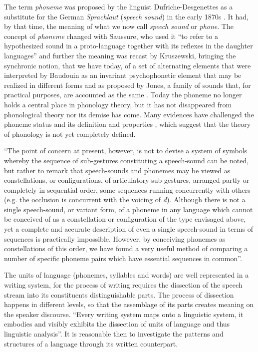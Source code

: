 The term \textit{phoneme} was proposed by the linguist Dufriche-Desgenettes
as a substitute for the German \textit{Sprachlaut} (\textit{speech sound}) in the early 1870s \citep{dresher2011}.
It had, by that time, the meaning of what we now call \textit{speech sound} or \textit{phone}.
The concept of \textit{phoneme} changed with Saussure, who used it ``to refer to a hypothesized sound in a 
proto-language together with its reflexes in the daughter languages'' and further the meaning was 
recast by Kruszewski, bringing the synchronic notion, that we have today, of a set of alternating elements 
that were interpreted by Baudouin as an invariant psychophonetic element that may be realized in different forms
and as proposed by Jones, a family of sounds that, for practical purposes, are
accounted as the same \citep{dresher2011}. Today the phoneme no longer holds a central place
in phonology theory, but it has not disappeared from phonological theory nor its demise has come.
Many evidences have challenged the phoneme status and
its definition and properties \citep{port2007,port2005,port2006}, which suggest that the 
theory of phonology is not yet completely defined.


``The point of concern at present, however, is not to
devise a system of symbols whereby the sequence of sub-gestures constituting a speech-sound 
can be noted, but rather to remark that speech-sounds and phonemes may be
viewed as constellations, or configurations, of articulatory sub-gestures, arranged partly
or completely in sequential order, some sequences running concurrently with others (e.g.
the occlusion is concurrent with the voicing of \textit{d}). Although there is not a single speech-sound, 
or variant form, of a phoneme in any language which cannot be conceived of as a
constellation or configuration of the type envisaged above, yet a complete and accurate
description of even a single speech-sound in terms of sequences is practically impossible.
However, by conceiving phonemes as constellations of this order, we have found a very
useful method of comparing a number of specific phoneme pairs which have essential
sequences in common''\citep{zipf1949}.


The units of language (phonemes, syllables and words) are well represented in a writing system,
for the process of writing requires the dissection of the
speech stream into its constituents distinguishable parts. The process of dissection happens in
different levels, so that the assemblage of its parts creates meaning on the speaker discourse.
``Every writing system maps onto a linguistic system, it embodies and visibly exhibits the 
dissection of units of language and thus linguistic analysis''\citep{coulmas}.
It is reasonable then to investigate the patterns and structures of a language through its
written counterpart.


